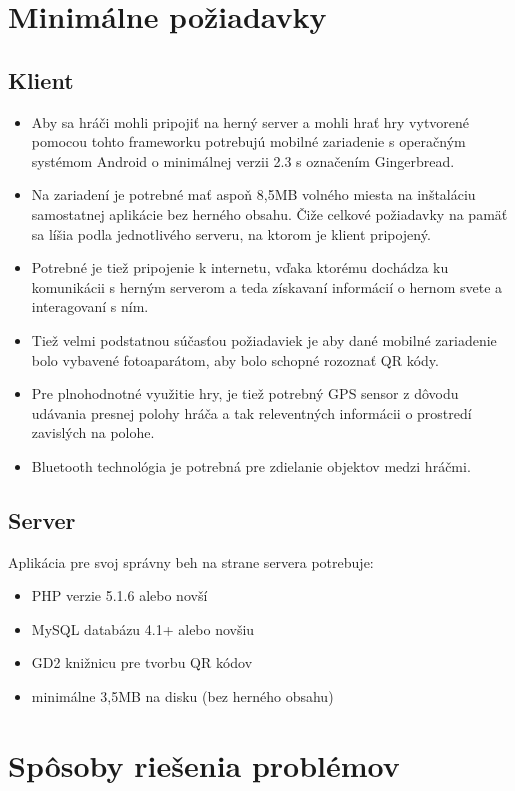 \section{Minimálne požiadavky}
\subsection{Klient}
\begin{itemize}
\item Aby sa hráči mohli pripojiť na herný server a mohli hrať hry vytvorené pomocou tohto frameworku potrebujú mobilné zariadenie s operačným systémom Android o minimálnej verzii 2.3 s označením Gingerbread. 
\item Na zariadení je potrebné mať aspoň 8,5MB volného miesta na inštaláciu samostatnej aplikácie bez herného obsahu. Čiže celkové požiadavky na pamäť sa líšia podla jednotlivého serveru, na ktorom je klient pripojený. 
\item Potrebné je tiež pripojenie k internetu, vďaka ktorému dochádza ku komunikácii s herným serverom a teda získavaní informácií o hernom svete a interagovaní s ním. 
\item Tiež velmi podstatnou súčasťou požiadaviek je aby dané mobilné zariadenie bolo vybavené fotoaparátom, aby bolo schopné rozoznať QR kódy. 
\item Pre plnohodnotné využitie hry, je tiež potrebný GPS sensor z dôvodu udávania presnej polohy hráča a tak releventných informácii o prostredí zavislých na polohe. 
\item Bluetooth technológia je potrebná pre zdielanie objektov medzi hráčmi. 
\end{itemize}

\subsection{Server}
Aplikácia pre svoj správny beh na strane servera potrebuje:
\begin{itemize}
\item PHP verzie 5.1.6 alebo novší \cite{codeigniter-requirements}
\item MySQL databázu 4.1+ alebo novšiu \cite{codeigniter-requirements}
\item GD2 knižnicu pre tvorbu QR kódov \cite{qrgenerator-info}
\item minimálne 3,5MB na disku (bez herného obsahu)
\end{itemize}

\section{Spôsoby riešenia problémov}
